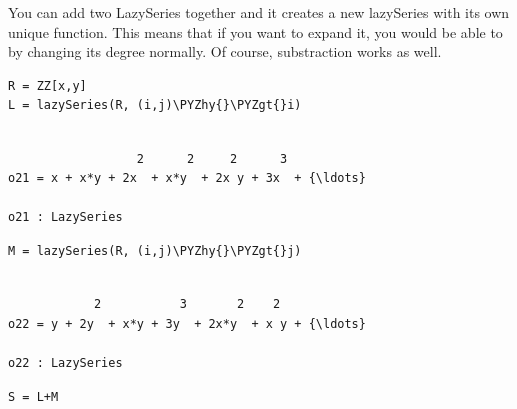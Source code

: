 \documentclass[11pt]{article}
\makeatletter
\def\PYZgt{\char`\>}
\def\PYZhy{\char`\-}
\newcommand{\boxspacing}{\kern\kvtcb@left@rule\kern\kvtcb@boxsep}
\newcommand{\prompt}[4]{
        {\ttfamily\llap{{\color{#2}[#3]:\hspace{3pt}#4}}\vspace{-\baselineskip}}
    }
\makeatother
\begin{document}
You can add two LazySeries together and it creates a new lazySeries with
its own unique function. This means that if you want to expand it, you
would be able to by changing its degree normally. Of course,
substraction works as well.

    \begin{tcolorbox}[breakable, size=fbox, boxrule=1pt, pad at break*=1mm,colback=cellbackground, colframe=cellborder]
\prompt{In}{incolor}{21}{\boxspacing}
\begin{Verbatim}[commandchars=\\\{\}]
R = ZZ[x,y]
L = lazySeries(R, (i,j)\PYZhy{}\PYZgt{}i)
\end{Verbatim}
\end{tcolorbox}

    \begin{Verbatim}[commandchars=\\\{\}]

                  2      2     2      3
o21 = x + x*y + 2x  + x*y  + 2x y + 3x  + {\ldots}

o21 : LazySeries
    \end{Verbatim}

    \begin{tcolorbox}[breakable, size=fbox, boxrule=1pt, pad at break*=1mm,colback=cellbackground, colframe=cellborder]
\prompt{In}{incolor}{22}{\boxspacing}
\begin{Verbatim}[commandchars=\\\{\}]
M = lazySeries(R, (i,j)\PYZhy{}\PYZgt{}j)
\end{Verbatim}
\end{tcolorbox}

    \begin{Verbatim}[commandchars=\\\{\}]

            2           3       2    2
o22 = y + 2y  + x*y + 3y  + 2x*y  + x y + {\ldots}

o22 : LazySeries
    \end{Verbatim}

    \begin{tcolorbox}[breakable, size=fbox, boxrule=1pt, pad at break*=1mm,colback=cellbackground, colframe=cellborder]
\prompt{In}{incolor}{23}{\boxspacing}
\begin{Verbatim}[commandchars=\\\{\}]
S = L+M
\end{Verbatim}
\end{tcolorbox}
\end{document}
